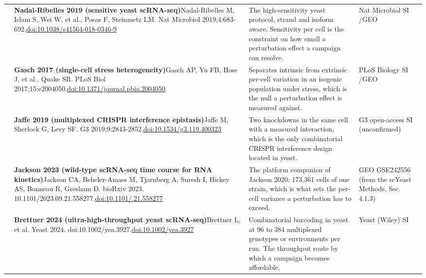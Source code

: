 \begin{landscape}
\begin{longtable}{@{}r@{\hspace{4pt}} L{86mm} L{92mm} L{62mm}@{}}
 & \textbf{Nadal-Ribelles 2019 (sensitive yeast scRNA-seq)}\newline Nadal-Ribelles M, Islam S, Wei W, et al., Posas F, Steinmetz LM. Nat Microbiol 2019;4:683-692.\newline \href{https://doi.org/10.1038/s41564-018-0346-9}{doi:10.1038/\allowbreak s41564-018-0346-9} & The high-sensitivity yeast protocol, strand and isoform aware. Sensitivity per cell is the constraint on how small a perturbation effect a campaign can resolve. & Nat Microbiol SI /\allowbreak  GEO \\
 & \textbf{Gasch 2017 (single-cell stress heterogeneity)}\newline Gasch AP, Yu FB, Hose J, et al., Quake SR. PLoS Biol 2017;15:e2004050.\newline \href{https://doi.org/10.1371/journal.pbio.2004050}{doi:10.1371/\allowbreak journal.pbio.2004050} & Separates intrinsic from extrinsic per-cell variation in an isogenic population under stress, which is the null a perturbation effect is measured against. & PLoS Biology SI /\allowbreak  GEO \\
 & \textbf{Jaffe 2019 (multiplexed CRISPR interference epistasis)}\newline Jaffe M, Sherlock G, Levy SF. G3 2019;9:2843-2852.\newline \href{https://doi.org/10.1534/g3.119.400323}{doi:10.1534/\allowbreak g3.119.400323} & Two knockdowns in the same cell with a measured interaction, which is the only combinatorial CRISPR interference design located in yeast. & G3 open-access SI (unconfirmed) \\
 & \textbf{Jackson 2023 (wild-type scRNA-seq time course for RNA kinetics)}\newline Jackson CA, Beheler-Amass M, Tjarnberg A, Suresh I, Hickey AS, Bonneau R, Gresham D. bioRxiv 2023. 10.1101/2023.09.21.558277.\newline \href{https://doi.org/10.1101/2023.09.21.558277}{doi:10.1101/.21.558277} & The platform companion of Jackson 2020: 173,361 cells of one strain, which is what sets the per-cell variance a perturbation has to exceed. & GEO GSE242556 (from the scYeast Methods, Sec. 4.1.3) \\
 & \textbf{Brettner 2024 (ultra-high-throughput yeast scRNA-seq)}\newline Brettner L, et al. Yeast 2024. doi:10.1002/yea.3927.\newline \href{https://doi.org/10.1002/yea.3927}{doi:10.1002/\allowbreak yea.3927} & Combinatorial barcoding in yeast at 96 to 384 multiplexed genotypes or environments per run. The throughput route by which a campaign becomes affordable. & Yeast (Wiley) SI \\

\end{longtable}
\end{landscape}
